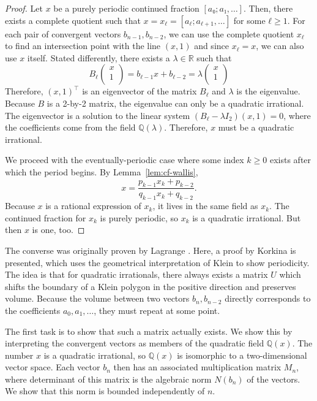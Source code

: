 \begin{proof}
  Let $x$ be a purely periodic continued fraction $[a₀; a₁, …]$.
  Then, there exists a complete quotient such that $x = x_ℓ = [a_ℓ; a_{ℓ+1}, …]$ for some $ℓ ≥ 1$.
  For each pair of convergent vectors $b_{n-1}, b_{n-2}$, we can use the
  complete quotient $x_ℓ$ to find an intersection point with the line $(x, 1)$
  and since $x_ℓ = x$, we can also use $x$ itself.
  Stated differently, there exists a $λ ∈ ℝ$ such that
  \[
    B_ℓ
    \begin{pmatrix}
      x \\
      1 \\
    \end{pmatrix}
    =
    b_{ℓ-1} x + b_{ℓ-2}
    = λ
    \begin{pmatrix}
      x \\
      1 \\
    \end{pmatrix}
  \]
  Therefore, $(x, 1)^⊤$ is an eigenvector of the matrix $B_ℓ$
  and $λ$ is the eigenvalue.
  Because $B$ is a 2-by-2 matrix,
  the eigenvalue can only be a quadratic irrational.
  The eigenvector is a solution to the linear system $(B_ℓ - λ I_2) (x, 1) = 0$,
  where the coefficients come from the field $ℚ(λ)$.
  Therefore, $x$ must be a quadratic irrational.

  We proceed with the eventually-periodic case
  where some index $k ≥ 0$ exists after which the period begins.
  By Lemma~\ref{lem:cf-wallis},
  \[
    x = \frac{p_{k-1} x_k + p_{k-2}}{q_{k-1} x_k + q_{k-2}}.
  \]
  Because $x$ is a rational expression of $x_k$,
  it lives in the same field as $x_k$.
  The continued fraction for $x_k$ is purely periodic, so $x_k$ is a quadratic irrational.
  But then $x$ is one, too.
\end{proof}

The converse was originally proven by Lagrange \cite{Lagrange70}.
Here, a proof by Korkina \cite{Korkina96} is presented,
which uses the geometrical interpretation of Klein to show periodicity.
The idea is that for quadratic irrationals,
there always exists a matrix $U$ which shifts the boundary of a Klein polygon
in the positive direction and preserves volume.
Because the volume between two vectors $b_n, b_{n-2}$ directly corresponds to
the coefficients $a_0, a_1, …$, they must repeat at some point.

The first task is to show that such a matrix actually exists.
We show this by interpreting the convergent vectors as members of the
quadratic field $ℚ(x)$.
The number $x$ is a quadratic irrational, so $ℚ(x)$ is isomorphic to a
two-dimensional vector space.
Each vector $b_n$ then has an associated multiplication matrix $M_n$,
where determinant of this matrix is the algebraic norm $N(b_n)$ of the vectors.
We show that this norm is bounded independently of $n$.

